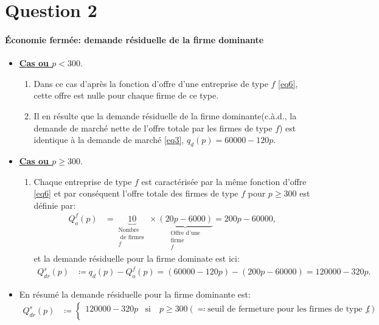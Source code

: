    \section{Question 2}
\frame{\sectionpage}
\begin{frame}
  [allowframebreaks]{\insertsection}
   \framesubtitle{Économie fermée: demande résiduelle de la firme dominante}
   \begin{itemize}
   \item \textbf{\underline{Cas ou $p< 300$}}.
   \begin{enumerate}[$\cdot$]
   \item Dans ce cas d'après la fonction d'offre d'une entreprise de type $f$ \eqref{eq6}, cette offre est nulle pour chaque firme de ce type.
   \item Il en résulte que la demande résiduelle de la firme dominante(c.à.d., la demande de marché nette de l'offre totale par les firmes de type $f$) est identique à la demande de marché \eqref{eq3}, $q_d(p) = 60000 - 120p$.
   \end{enumerate}
    \item \textbf{\underline{Cas ou $p\geq 300$}}.
    \begin{enumerate}[$\cdot$]
   \item Chaque entreprise de type $f$ est caractérisée par la même fonction d'offre \eqref{eq6} et par conséquent l'offre totale des firmes de type $f$ 
   pour $p\geq 300$ est définie par:
   \begin{align}
   Q^f_o(p) &= \underbrace{10}_{\substack{\text{Nombre}\\ \text{ de firmes }\\ f}} \times \underbrace{(20p-6000 )}_{\substack{\text{Offre d'une}\\ 
   \text{firme }\\f}} = 200p - 60000,
   \end{align}
   et la demande résiduelle pour la firme dominate est ici:
     \begin{align*}
Q_{dr}^s(p) &\coloneqq q_d(p) - Q^f_o(p) =  (60000 - 120p) -  (200p - 60000) = 120000-320p.
\end{align*}
    \end{enumerate}
    \item En résumé la demande résiduelle pour la firme dominante est:
    \begin{align}
Q_{dr}^s(p)&\coloneqq \left\{
\begin{array}{ll}
120000-320p& \text{si} \quad p\geq 300 (\eqqcolon \text{seuil de fermeture pour les firmes de type $f$}), \\

\end{array}
\end{align}
\end{itemize}
\end{frame}
